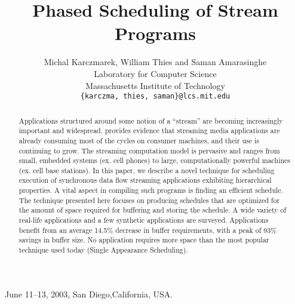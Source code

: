 \documentclass[runningheads,roman]{sig-alt-full}
\title{Phased Scheduling of Stream Programs}
\author{Michal Karczmarek, William Thies and Saman
Amarasinghe \\
Laboratory for Computer Science \\
Massachusetts Institute of Technology \\
\texttt{\{karczma, thies, saman\}@lcs.mit.edu} \vspace{-24pt}}
\date{}
\begin{document}
 {June 11--13, 2003, San Diego,California, USA.}

\maketitle



\vspace{0.1in}

\begin{abstract}
Applications structured around some notion of a ``stream'' are
becoming increasingly important and widespread. \cite{Rix98}
provides evidence that streaming media applications are already
consuming most of the cycles on consumer machines, and their use
is continuing to grow. The streaming computation model is
pervasive and ranges from small, embedded systems (ex. cell
phones) to large, computationally powerful machines (ex. cell base
stations). In this paper, we describe a novel technique for
scheduling execution of synchronous data flow streaming
applications exhibiting hierarchical properties. A vital aspect in
compiling such programs is finding an efficient schedule. The
technique presented here focuses on producing schedules that are
optimized for the amount of space required for buffering and
storing the schedule. A wide variety of real-life applications and
a few synthetic applications are surveyed. Applications benefit
from an average 14.5\% decrease in buffer requirements, with a
peak of 93\% savings in buffer size. No application requires more
space than the most popular technique used today (Single
Appearance Scheduling).
\end{abstract}

%
%

%




%



%




%

%
\end{document}

